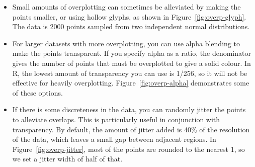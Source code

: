 \begin{itemize}
  \item Small amounts of overplotting can sometimes be alleviated by making the points smaller, or using hollow glyphs, as shown in Figure~\ref{fig:overp-glyph}.  The data is 2000 points sampled from two independent normal distributions.

    
  
  \item For larger datasets with more overplotting, you can use alpha blending to make the points transparent.  If you specify alpha as a ratio, the denominator gives the number of points that must be overplotted to give a solid colour.  In R, the lowest amount of transparency you can use is 1/256, so it will not be effective for heavily overplotting.  Figure~\ref{fig:overp-alpha} demonstrates some of these options.
    
    

  \item If there is some discreteness in the data, you can randomly jitter the points to alleviate overlaps.  This is particularly useful in conjunction with transparency.  By default, the amount of jitter added is 40\% of the resolution of the data, which leaves a small gap between adjacent regions. In Figure~\ref{fig:overp-jitter}, most of the points are rounded to the nearest 1, so we set a jitter width of half of that.
  

\end{itemize}
